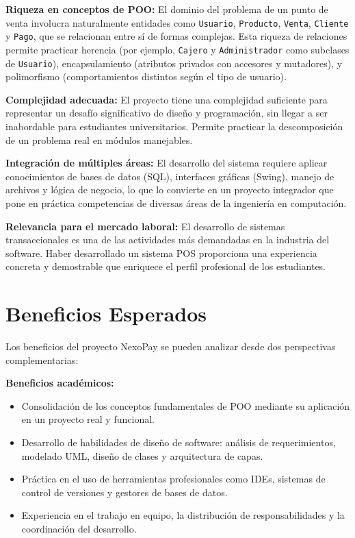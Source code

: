 \documentclass[12pt,a4paper]{report}
\begin{document}
\textbf{Riqueza en conceptos de POO:} El dominio del problema de un punto de venta involucra naturalmente entidades como \texttt{Usuario}, \texttt{Producto}, \texttt{Venta}, \texttt{Cliente} y \texttt{Pago}, que se relacionan entre sí de formas complejas. Esta riqueza de relaciones permite practicar herencia (por ejemplo, \texttt{Cajero} y \texttt{Administrador} como subclases de \texttt{Usuario}), encapsulamiento (atributos privados con accesores y mutadores), y polimorfismo (comportamientos distintos según el tipo de usuario).

\textbf{Complejidad adecuada:} El proyecto tiene una complejidad suficiente para representar un desafío significativo de diseño y programación, sin llegar a ser inabordable para estudiantes universitarios. Permite practicar la descomposición de un problema real en módulos manejables.

\textbf{Integración de múltiples áreas:} El desarrollo del sistema requiere aplicar conocimientos de bases de datos (SQL), interfaces gráficas (Swing), manejo de archivos y lógica de negocio, lo que lo convierte en un proyecto integrador que pone en práctica competencias de diversas áreas de la ingeniería en computación.

\textbf{Relevancia para el mercado laboral:} El desarrollo de sistemas transaccionales es una de las actividades más demandadas en la industria del software. Haber desarrollado un sistema POS proporciona una experiencia concreta y demostrable que enriquece el perfil profesional de los estudiantes.

\section{Beneficios Esperados}

Los beneficios del proyecto NexoPay se pueden analizar desde dos perspectivas complementarias:

\textbf{Beneficios académicos:}
\begin{itemize}
    \item Consolidación de los conceptos fundamentales de POO mediante su aplicación en un proyecto real y funcional.
    \item Desarrollo de habilidades de diseño de software: análisis de requerimientos, modelado UML, diseño de clases y arquitectura de capas.
    \item Práctica en el uso de herramientas profesionales como IDEs, sistemas de control de versiones y gestores de bases de datos.
    \item Experiencia en el trabajo en equipo, la distribución de responsabilidades y la coordinación del desarrollo.
\end{itemize}
\end{document}

